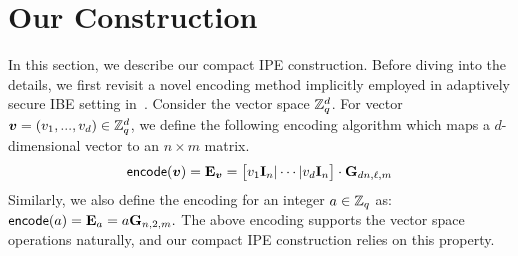 \section{Our Construction}
In this section, we describe our compact IPE construction. Before diving into the details, we first revisit a novel encoding method implicitly employed in adaptively secure IBE setting in~\cite{EPRINT:ApoFanLiu16a}. Consider the vector space $\mathbb{Z}_q^d$. For vector $\boldsymbol{v} = (v_1,..., v_d) \in \mathbb{Z}_q^d$, we define the following encoding algorithm which maps a $d$-dimensional vector to an $n \times m$ matrix.
\begin{equation} \label{equ:enc}
\mathsf{encode}(\boldsymbol{v}) = \mathbf{E}_{\boldsymbol{v}} = \big[v_1 \mathbf{I}_n | \cdots | v_d \mathbf{I}_n \big] \cdot
\mathbf{G}_{dn, \ell, m}
\end{equation}
Similarly, we also define the encoding for an integer $a \in \mathbb{Z}_q$ as:
$\mathsf{encode}(a) = \mathbf{E}_a = a \mathbf{G}_{n, 2, m}.$ The above encoding supports the vector space operations naturally, and our compact IPE construction relies on this property.

